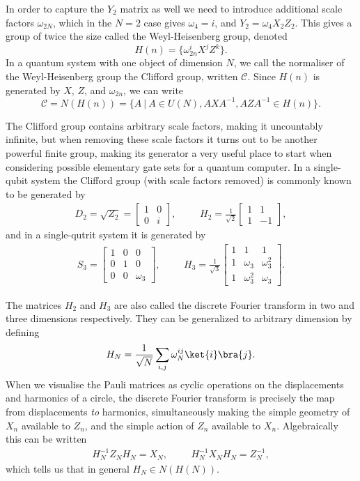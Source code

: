 In order to capture the $Y_2$ matrix as well we need to introduce additional scale factors $\omega_{2N}$, which in the $N=2$ case gives $\omega_4 = i$, and $Y_2 = \omega_{4}X_2Z_2$. This gives a group of twice the size called the Weyl-Heisenberg group, denoted
\[H(n) = \{\omega_{2n}^iX^jZ^k\}.\]
In a quantum system with one object of dimension $N$, we call the normaliser of the Weyl-Heisenberg group the Clifford group, written $\mathcal{C}$. Since $H(n)$ is generated by $X$, $Z$, and $\omega_{2n}$, we can write
\[\mathcal{C} = N(H(n)) = \{A\ |\ A \in U(N), AXA^{-1}, AZA^{-1} \in H(n)\}.\]

The Clifford group contains arbitrary scale factors, making it uncountably infinite, but when removing these scale factors it turns out to be another powerful finite group, making its generator a very useful place to start when considering possible elementary gate sets for a quantum computer. In a single-qubit system the Clifford group (with scale factors removed) is commonly known to be generated by
\begin{align*}
D_2 = \sqrt{Z_2} = \begin{bmatrix}
1 & 0 \\
0 & i
\end{bmatrix},
&&&
H_2 = \frac{1}{\sqrt{2}}\begin{bmatrix}
1 & 1 \\
1 & -1
\end{bmatrix},
\end{align*}
and in a single-qutrit system it is generated by
\begin{align*}
S_3 = \begin{bmatrix}
1 & 0 & 0 \\
0 & 1 & 0 \\
0 & 0 & \omega_3
\end{bmatrix},
&&&
H_3 = \frac{1}{\sqrt{3}}\begin{bmatrix}
1 & 1 & 1 \\
1 & \omega_3 & \omega_3^2 \\
1 & \omega_3^2 & \omega_3
\end{bmatrix}.
\end{align*}

The matrices $H_2$ and $H_3$ are also called the discrete Fourier transform in two and three dimensions respectively. They can be generalized to arbitrary dimension by defining
\[H_N = \frac{1}{\sqrt{N}}\sum_{i,j} \omega_N^{ij}\ket{i}\bra{j}.\]
When we visualise the Pauli matrices as cyclic operations on the displacements and harmonics of a circle, the discrete Fourier transform is precisely the map from displacements \emph{to} harmonics, simultaneously making the simple geometry of $X_n$ available to $Z_n$, and the simple action of $Z_n$ available to $X_n$. Algebraically this can be written
\begin{align*}
H_N^{-1}Z_NH_N = X_N, &&& H_N^{-1}X_NH_N = Z_N^{-1},
\end{align*}
which tells us that in general $H_N \in N(H(N))$.

